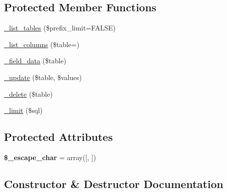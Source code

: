 \subsection*{Protected Member Functions}
\begin{DoxyCompactItemize}
\item 
\mbox{\hyperlink{class_c_i___d_b__pdo__4d__driver_ad591ef8fff2b28c7c966d8cadd12ad5d}{\+\_\+list\+\_\+tables}} (\$prefix\+\_\+limit=F\+A\+L\+SE)
\item 
\mbox{\hyperlink{class_c_i___d_b__pdo__4d__driver_a3bbed30c53aee81f9682f456d6747e25}{\+\_\+list\+\_\+columns}} (\$table=\textquotesingle{}\textquotesingle{})
\item 
\mbox{\hyperlink{class_c_i___d_b__pdo__4d__driver_a00fd55ed37117db3b9a3de70d64fc8b4}{\+\_\+field\+\_\+data}} (\$table)
\item 
\mbox{\hyperlink{class_c_i___d_b__pdo__4d__driver_a151a5db84417c97c3daa353d4a5e73b8}{\+\_\+update}} (\$table, \$values)
\item 
\mbox{\hyperlink{class_c_i___d_b__pdo__4d__driver_aa4dc675f50b8bc3c59e65b66b085b3ab}{\+\_\+delete}} (\$table)
\item 
\mbox{\hyperlink{class_c_i___d_b__pdo__4d__driver_a6e8d1d31e5142de908d60a0ca2489f88}{\+\_\+limit}} (\$sql)
\end{DoxyCompactItemize}
\subsection*{Protected Attributes}
\begin{DoxyCompactItemize}
\item 
\mbox{\label{class_c_i___d_b__pdo__4d__driver_a326241d3744cc0a3659ad9288baf98af}} 
{\bfseries \$\+\_\+escape\+\_\+char} = array(\textquotesingle{}\mbox{[}\textquotesingle{}, \textquotesingle{}\mbox{]}\textquotesingle{})
\end{DoxyCompactItemize}


\subsection{Constructor \& Destructor Documentation}
\mbox{\label{class_c_i___d_b__pdo__4d__driver_adaf0303dddbe1d77a2227b36d94307ea}} 
